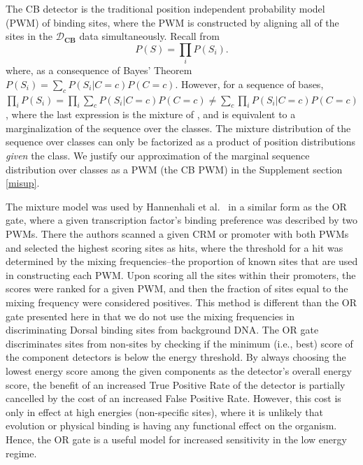 The CB detector is the traditional position independent probability model (PWM) of binding sites, where the PWM is constructed by aligning all of the sites in the $\mathcal D_{\textbf{CB}}$  data simultaneously.
Recall from 
\begin{equation}\label{cbpwm}
P(S)=\prod_i P(S_i).
\end{equation}
where, as a consequence of Bayes' Theorem $P(S_i)=\sum_c P(S_i|C=c)P(C=c)$.
However, for a sequence of bases, $\prod_i P(S_i)=\prod_i \sum_c P(S_i|C=c)P(C=c) \neq \sum_{c}\prod_i P(S_i|C=c)P(C=c)$, where the last expression is the mixture of , and is equivalent to a marginalization of the sequence over the classes.  The mixture distribution of the sequence over classes can only be factorized as a product of position distributions {\em given} the class. 
We justify our approximation of the marginal sequence distribution over classes as a PWM (the CB PWM) in the Supplement section \ref{misup}. %

 The mixture model was used by Hannenhali et al.~\cite{Hannenhalli01062005} in a similar form as the OR gate, where a given transcription factor's binding preference was described by two PWMs.  There the authors scanned a given CRM or promoter with both PWMs and selected the highest scoring sites as hits, where the threshold for a hit was determined by the mixing frequencies--the proportion of known sites that are used in constructing each PWM.  Upon scoring all the sites within their promoters, the scores were ranked for a given PWM, and then the fraction of sites equal to the mixing frequency were considered positives.  This method is different than the OR gate presented here in that we do not use the mixing frequencies in discriminating Dorsal binding sites from background DNA.  The OR gate discriminates sites from non-sites by checking if the minimum (i.e., best) score of the component detectors is below the energy threshold.  By always choosing the lowest energy score among the given components as the detector's overall energy score, the benefit of an increased True Positive Rate of the detector is partially cancelled by the cost of an increased False Positive Rate.  However, this cost is only in effect at high energies (non-specific sites), where it is unlikely that evolution or physical binding is having any functional effect on the organism.  Hence, the OR gate is a useful model for increased sensitivity in the low energy regime.


